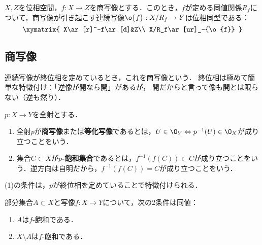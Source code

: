 \documentclass[uplatex,dvipdfmx]{jsreport}
\begin{document}
\begin{corollary}[準同型定理]
    $X,Z$を位相空間，$f:X\to Z$を商写像とする．このとき，$f$が定める同値関係$R_f$について，商写像が引き起こす連続写像$\o{f}:X/R_f\to Y$は位相同型である：
    \[\xymatrix{
        X\ar[r]^-f\ar[d]&Z\\
        X/R_f\ar[ur]_-{\o{f}}
    }\]
\end{corollary}

\subsection{商写像}

\begin{tcolorbox}[colframe=ForestGreen, colback=ForestGreen!10!white,breakable,colbacktitle=ForestGreen!40!white,coltitle=black,fonttitle=\bfseries\sffamily,
title=]
    連続写像が終位相を定めているとき，これを商写像という．
    終位相は極めて簡単な特徴付け：「逆像が開なら開」があるが，
    開だからと言って像も開とは限らない（逆も然り）．
\end{tcolorbox}

\begin{definition}
    $p:X\to Y$を全射とする．
    \begin{enumerate}
        \item 全射$p$が\textbf{商写像}または\textbf{等化写像}であるとは，$U\in\O_Y\Leftrightarrow p^{-1}(U)\in\O_X$が成り立つことをいう．
        \item 集合$C\subset X$が\textbf{$p$-飽和集合}であるとは，$f^{-1}(f(C))\subset C$が成り立つことをいう．逆方向は自明だから，$f^{-1}(f(C))=C$が成り立つことをいう．
    \end{enumerate}
\end{definition}
\begin{remarks}
    (1)の条件は，$p$が終位相を定めていることで特徴付けられる．
\end{remarks}

\begin{lemma}
    部分集合$A\subset X$と写像$f:X\to Y$について，次の2条件は同値：
    \begin{enumerate}
        \item $A$は$f$-飽和である．
        \item $X\setminus A$は$f$-飽和である．
    \end{enumerate}
\end{lemma}
\end{document}
